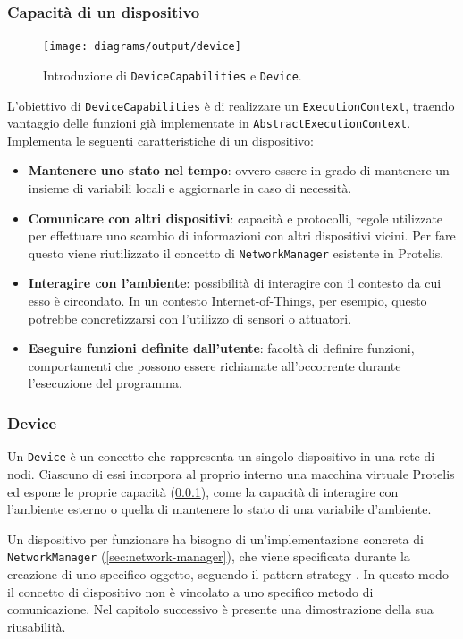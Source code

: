 \subsubsection{Capacità di un dispositivo}
\label{sec:device-capabilities}

\begin{figure}
  \centering
  \texttt{[image: diagrams/output/device]}
  \caption{Introduzione di \texttt{DeviceCapabilities} e \texttt{Device}.}
  \label{fig:uml-device}
\end{figure}

L'obiettivo di \texttt{DeviceCapabilities} è di realizzare un \texttt{ExecutionContext},
traendo vantaggio delle funzioni già implementate in
\texttt{AbstractExecutionContext}. Implementa le seguenti caratteristiche di un dispositivo:
\begin{itemize}
\item \textbf{Mantenere uno stato nel tempo}: ovvero essere in grado di
  mantenere un insieme di variabili locali e aggiornarle in caso di necessità.
\item \textbf{Comunicare con altri dispositivi}: capacità e protocolli, regole
  utilizzate per effettuare uno scambio di informazioni con altri dispositivi
  vicini. Per fare questo viene riutilizzato il concetto di
  \texttt{NetworkManager} esistente in Protelis.
\item \textbf{Interagire con l'ambiente}: possibilità di interagire con il
  contesto da cui esso è circondato. In un contesto Internet-of-Things, per
  esempio, questo potrebbe concretizzarsi con l'utilizzo di sensori o attuatori.
\item \textbf{Eseguire funzioni definite dall'utente}: facoltà di definire
  funzioni, comportamenti che possono essere richiamate all'occorrente durante
  l'esecuzione del programma.
\end{itemize}

\subsubsection{Device}


Un \texttt{Device} è un concetto che rappresenta un singolo dispositivo in una
rete di nodi. Ciascuno di essi incorpora al proprio interno una macchina
virtuale Protelis ed espone le proprie capacità (\ref{sec:device-capabilities}),
come la capacità di interagire con l'ambiente esterno o quella di mantenere lo
stato di una variabile d'ambiente.

Un dispositivo per funzionare ha bisogno di un'implementazione concreta di
\texttt{NetworkManager} (\ref{sec:network-manager}), che viene specificata
durante la creazione di uno specifico oggetto, seguendo il pattern strategy
\cite{Gamma:1995:DPE:186897}. In questo modo il concetto di dispositivo non è
vincolato a uno specifico metodo di comunicazione. Nel capitolo successivo è
presente una dimostrazione della sua riusabilità.

